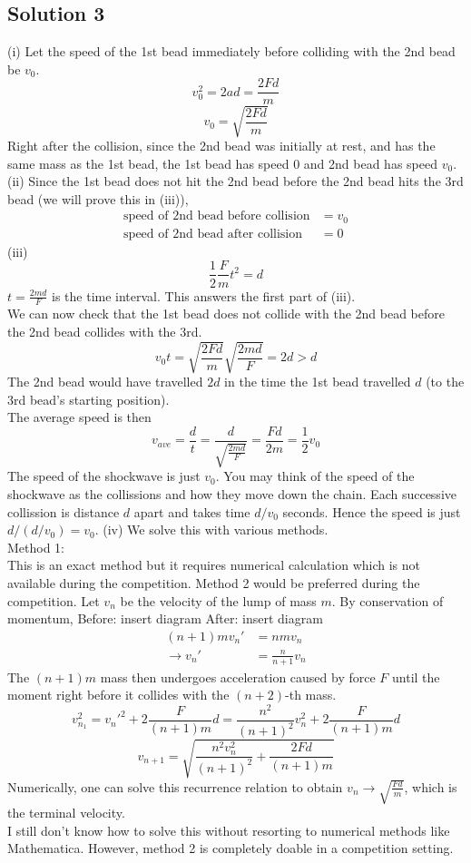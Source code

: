 \documentclass{article}
\begin{document}
\subsection{Solution 3}
(i) Let the speed of the 1st bead immediately before colliding with the 2nd bead be $v_0$.
\[v_0^2 = 2ad = \frac{2Fd}{m}\]
\[v_0 = \sqrt{\frac{2Fd}{m}}\]
Right after the collision, since the 2nd bead was initially at rest, and has the same mass as the 1st bead, the 1st bead has speed 0 and 2nd bead has speed $v_0$.
(ii) Since the 1st bead does not hit the 2nd bead before the 2nd bead hits the 3rd bead (we will prove this in (iii)),
\begin{align} 
	\text{speed of 2nd bead before collision} &= v_0 \\
	\text{speed of 2nd bead after collision} &= 0
\end{align}
(iii) 
\[\frac{1}{2}\frac{F}{m} t^2 = d\] $t=\frac{2md}{F}$ is the time interval. This answers the first part of (iii). \\
We can now check that the 1st bead does not collide with the 2nd bead before the 2nd bead collides with the 3rd.
\[v_0 t = \sqrt{\frac{2Fd}{m}} \sqrt{\frac{2md}{F}} = 2d > d\]
The 2nd bead would have travelled $2d$ in the time the 1st bead travelled $d$ (to the 3rd bead's starting position). \\
The average speed is then \[v_{ave} = \frac{d}{t} = \frac{d}{\sqrt{\frac{2md}{F}}} = \frac{Fd}{2m} = \frac{1}{2} v_0\]
The speed of the shockwave is just $v_0$. You may think of the speed of the shockwave as the collissions and how they move down the chain. Each successive collission is distance $d$ apart and takes time $d/v_0$ seconds. Hence the speed is just $d/(d/v_0) = v_0$.
(iv) We solve this with various methods. \\
Method 1: \\ 
This is an exact method but it requires numerical calculation which is not available during the competition. Method 2 would be preferred during the competition.
Let $v_n$ be the velocity of the lump of mass $m$. By conservation of momentum,
Before: insert diagram
After: insert diagram
\begin{align}
	(n+1) m v_n' &= nm v_n\\
	\rightarrow	v_n' &= \frac{n}{n+1} v_n
\end{align}
The $(n+1)m$ mass then undergoes acceleration caused by force $F$ until the moment right before it collides with the $(n+2)$-th mass.
\[v_{n_1}^2 = v_n'^2 + 2 \frac{F}{(n+1)m} d = \frac{n^2}{(n+1)^2} v_n^2 + 2\frac{F}{(n+1)m} d \]
\[v_{n+1} = \sqrt{\frac{n^2 v_n^2}{(n+1)^2} + \frac{2Fd}{(n+1)m}}\]
Numerically, one can solve this recurrence relation to obtain $v_n \rightarrow \sqrt{\frac{Fd}{m}}$, which is the terminal velocity.\\
I still don't know how to solve this without resorting to numerical methods like Mathematica. However, method 2 is completely doable in a competition setting.
\end{document}
